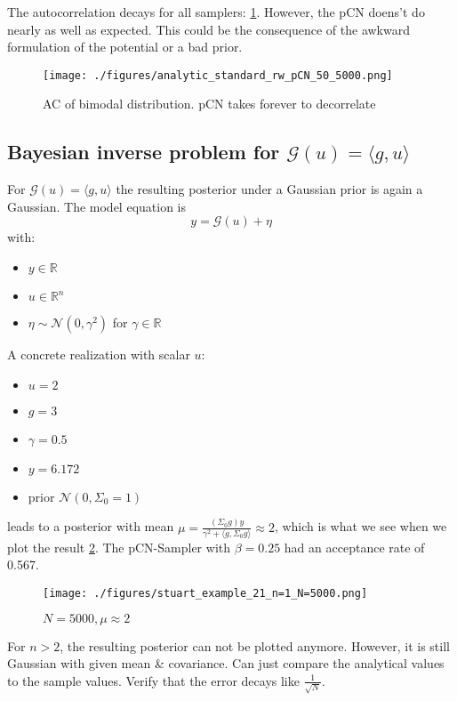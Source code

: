 \documentclass[11pt]{article}
\newcommand{\R}{{\mathbb{R}}}
\newcommand{\G}[1]{{\mathcal{G} \left( #1 \right)}}
\newcommand{\N}[2]{\mathcal{N}\left(#1,#2\right)}
\begin{document}
The autocorrelation decays for all samplers: \ref{fig:ac_bimodal}. However, the pCN doens't
do nearly as well as expected. This could be the consequence of the awkward
formulation of the potential or a bad prior.

\begin{figure}[htbp]
\centering
\texttt{[image: ./figures/analytic\_standard\_rw\_pCN\_50\_5000.png]}
\caption{\label{fig:ac_bimodal}
AC of bimodal distribution. pCN takes forever to decorrelate}
\end{figure}

\subsection{Bayesian inverse problem for \(\G{u} = \langle g,u \rangle\)}
\label{sec:org20f8178}
For \(\G{u} = \langle g,u \rangle\) the resulting posterior under a Gaussian prior
is again a Gaussian. The model equation is
$$y = \G{u} + \eta$$
with:
\begin{itemize}
\item \(y \in \R\)
\item \(u \in \R^n\)
\item \(\eta \sim \N{0}{\gamma^2}\) for \(\gamma \in \R\)
\end{itemize}

A concrete realization with scalar \(u\):
\begin{itemize}
\item \(u = 2\)
\item \(g = 3\)
\item \(\gamma = 0.5\)
\item \(y=6.172\)
\item prior \(\N{0}{\Sigma_0=1}\)
\end{itemize}
leads to a posterior with mean
\(\mu = \frac{(\Sigma_0g)y}{\gamma^2 + \langle g, \Sigma_0g \rangle} \approx 2\),
which is what we see when we plot the result \ref{fig:stuart_21_density}.
The pCN-Sampler with \(\beta = 0.25\) had an acceptance rate of 0.567.

\begin{figure}[htbp]
\centering
\texttt{[image: ./figures/stuart\_example\_21\_n=1\_N=5000.png]}
\caption{\label{fig:stuart_21_density}
\(N=5000, \mu \approx 2\)}
\end{figure}

For \(n>2\), the resulting posterior can not be plotted anymore. However, it is still Gaussian
with given mean \& covariance. Can just compare the analytical values to the sample values.
Verify that the error decays like \(\frac{1}{\sqrt{N}}\).
\end{document}
